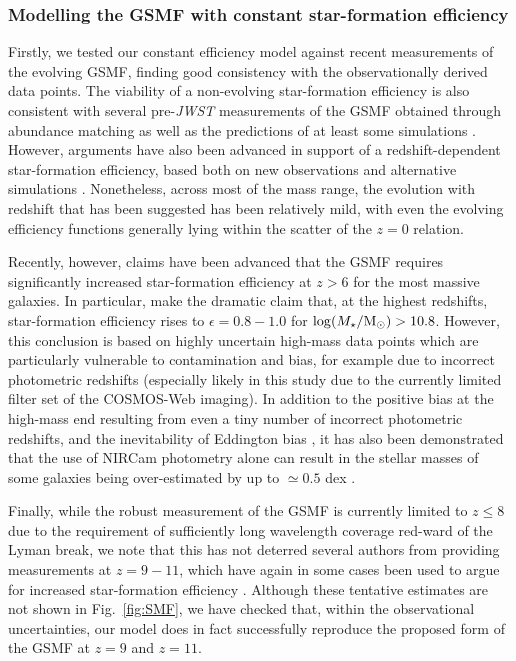 \documentclass[fleqn,usenatbib]{mnras}
\begin{document}
\subsubsection{Modelling the GSMF with constant star-formation efficiency}

Firstly,  we tested our constant efficiency model against recent measurements of the evolving GSMF, finding good consistency with the observationally derived data points. The viability of a non-evolving star-formation efficiency is also consistent with several pre-\textit{JWST} measurements of the GSMF obtained through abundance matching \citep{behroozi2013,stefanon2021} as well as the predictions of at least some simulations \citep{feldmann2024}. However, arguments have also been advanced in support of a redshift-dependent star-formation efficiency, based both on  new observations \citep{shuntov2024} and alternative simulations \citep{ceverino2024}. Nonetheless, across most of the mass range, the evolution with redshift that has been suggested has been relatively mild, with even the evolving efficiency functions generally lying  within the scatter of the $z=0$ relation. 

Recently, however, claims have been advanced that the GSMF requires significantly increased star-formation efficiency at $z>6$ for the most massive galaxies. In particular, \citet{shuntov2024} make the dramatic claim that, at the highest redshifts, star-formation efficiency rises to $\epsilon=0.8-1.0$ for $\log(M_{\star}/ \rm M_{\odot})>10.8$. However, this conclusion is based on highly uncertain high-mass data points which are particularly vulnerable to contamination and bias, for example due to incorrect photometric redshifts (especially likely in this study due to the currently limited filter set of the COSMOS-Web imaging). In addition to the positive bias at the high-mass end resulting from even a tiny number of incorrect photometric redshifts, and the inevitability of Eddington bias \citep{eddington1913}, it has also been demonstrated that the use of NIRCam photometry alone can result in the stellar masses of some galaxies being over-estimated by up to $\simeq0.5$ dex \citep{wang2024}. 

Finally, while  the robust measurement of the GSMF is currently limited to $z\leq8$ due to the requirement of sufficiently long wavelength coverage red-ward of the Lyman break, we note that this has not deterred several authors from providing measurements at $z = 9-11$, which have again in some cases been used to argue for increased star-formation efficiency \citep{harvey2024,weibel2024,shuntov2024}. 
Although these tentative estimates are not shown in Fig.~\ref{fig:SMF}, we have checked that, within the observational uncertainties, our model does in fact successfully reproduce the proposed form of the GSMF  at $z=9$ and $z=11$.
\end{document}
